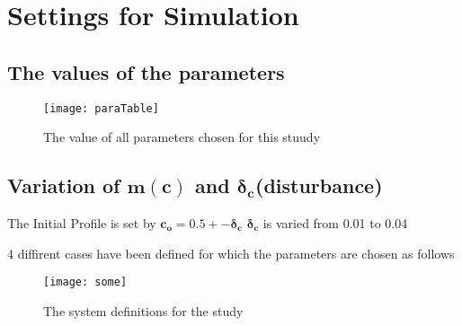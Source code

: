 \chapter{Settings for Simulation}

\section{The values of the parameters}

\begin{figure}[H]
\texttt{[image: paraTable]}
\caption{The value of all parameters chosen for this stuudy}
\end{figure}

\section{Variation of $\mathbold{m(c)}$ and $\mathbold{\delta_c}$(disturbance)}
The Initial Profile is set by $\mathbold{c_o=0.5 +- \delta_c}$
$\mathbold{\delta_c}$ is varied from 0.01 to 0.04

4 diffirent cases have been defined for which the parameters are chosen as follows

\begin{figure}[H]
\texttt{[image: some]}
\caption{The system definitions for the study}
\end{figure}


